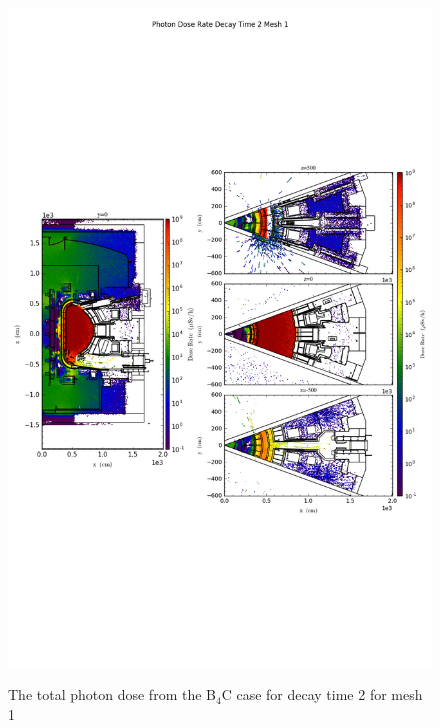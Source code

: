 \begin{figure}[ht!]
\centering
\includegraphics[trim={0cm 9cm 0cm 10cm},clip,scale=0.75]{../plots/final_model_with_b4c/Photon_Dose_Rate_Decay_Time_2_Mesh_1.png}
\label{fig:photons_dc2_no4bc_m1_flux}
\caption{The total photon dose from the B$_4$C case for decay time 2 for mesh 1}
\end{figure}
